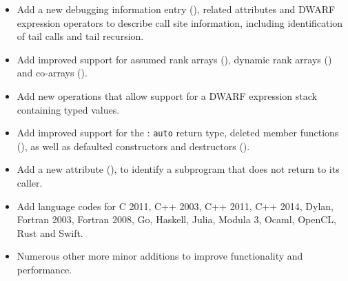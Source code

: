 \begin{itemize}
\item Add a new debugging information entry (\DWTAGcallsiteNAME), related 
attributes and DWARF expression operators to describe call site information, 
including identification of tail calls and tail recursion.
\item Add improved support for  assumed rank arrays 
(\DWTAGgenericsubrangeNAME), dynamic rank arrays (\DWATrankNAME)
and co-arrays (\DWTAGcoarraytypeNAME{}).
\item Add new operations that allow support for 
a DWARF expression stack containing typed values.
\item Add improved support for the :
\texttt{auto} return type, deleted member functions (\DWATdeletedNAME), 
as well as defaulted constructors and destructors (\DWATdefaultedNAME).
\item Add a new attribute (\DWATnoreturnNAME{}), to identify 
a subprogram that does not return to its caller.
\item Add language codes for C 2011, C++ 2003, C++ 2011, C++ 2014,
Dylan, Fortran 2003, Fortran 2008, Go, Haskell, 
Julia, Modula 3, Ocaml, OpenCL, Rust and Swift.
\item Numerous other more minor additions to improve functionality
and performance.
\end{itemize}

